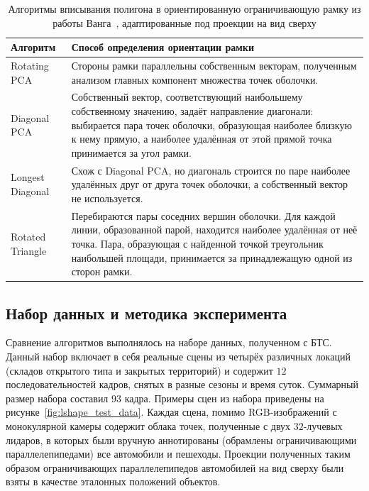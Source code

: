 \begin{table}[htbp]
	\small
	\centering
	\begin{tabular}{|p{}|p{}|}
		\hline
		\textbf{Алгоритм} & \textbf{Способ определения ориентации рамки} \\
		\hline
		Rotating PCA & Стороны рамки параллельны собственным векторам, полученным анализом главных компонент множества точек оболочки. \\
		\hline
		Diagonal PCA & Собственный вектор, соответствующий наибольшему собственному значению, задаёт направление диагонали: выбирается пара точек оболочки, образующая наиболее близкую к нему прямую, а наиболее удалённая от этой прямой точка принимается за угол рамки. \\
		\hline
		Longest Diagonal & Схож с Diagonal PCA, но диагональ строится по паре наиболее удалённых друг от друга точек оболочки, а собственный вектор не используется. \\
		\hline
		Rotated Triangle & Перебираются пары соседних вершин оболочки. Для каждой линии, образованной парой, находится наиболее удалённая от неё точка. Пара, образующая с найденной точкой треугольник наибольшей площади, принимается за принадлежащую одной из сторон рамки. \\
		\hline
	\end{tabular}
	\caption{Алгоритмы вписывания полигона в ориентированную ограничивающую рамку из работы Ванга~\cite{Wang2021}, адаптированные под проекции на вид сверху}
	\label{tab:wang-algorithms}
\end{table}

\subsection{Набор данных и методика эксперимента}

Сравнение алгоритмов выполнялось на наборе данных, полученном с БТС. Данный набор включает в себя реальные сцены из четырёх различных локаций (складов открытого типа и закрытых территорий) и содержит $12$ последовательностей кадров, снятых в разные сезоны и время суток. Суммарный размер набора составил $93$ кадра. Примеры сцен из набора приведены на рисунке~\cref{fig:lshape_test_data}. Каждая сцена, помимо RGB-изображений с монокулярной камеры содержит облака точек, полученные с двух $32$-лучевых лидаров, в которых были вручную аннотированы (обрамлены ограничивающими параллелепипедами) все автомобили и пешеходы. Проекции полученных таким образом ограничивающих параллелепипедов автомобилей на вид сверху были взяты в качестве эталонных положений объектов.


